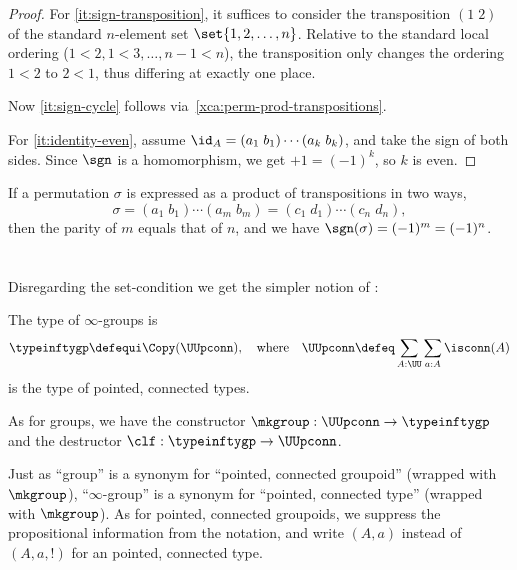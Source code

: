 \begin{proof}
  For \ref{it:sign-transposition},
  it suffices to consider the transposition $(1\;2)$ of the standard $n$-element set
  $\set{1,2,\dots,n}$.
  Relative to the standard local ordering ($1<2,1<3,\dots,n-1<n$),
  the transposition only changes the ordering $1<2$ to $2<1$,
  thus differing at exactly one place.

  Now \ref{it:sign-cycle} follows via~\cref{xca:perm-prod-transpositions}.

  For \ref{it:identity-even}, assume $\id_A = (a_1\;b_1)\cdots(a_k\;b_k)$,
  and take the sign of both sides. Since $\sgn$ is a homomorphism,
  we get $+1 = (-1)^k$, so $k$ is even.
\end{proof}

\begin{corollary}\label{cor:sign-defined}
  If a permutation $\sigma$ is expressed as a product of transpositions in two ways,
  \[
    \sigma = (a_1\;b_1)\cdots(a_m\;b_m)
    = (c_1\;d_1)\cdots(c_n\;d_n),
  \]
  then the parity of $m$ equals that of $n$,
  and we have $\sgn(\sigma)=(-1)^m=(-1)^n$.
\end{corollary}

\section{\texorpdfstring{\inftygps}{∞-groups}}
\label{sec:inftygps}

Disregarding the set-condition we get the simpler notion of \inftygps:
\begin{definition}\label{def:inftygps}
  The type of $\infty$-groups is
  \[
    \typeinftygp\defequi \Copy(\UUpconn),
    \quad\text{where}\quad
    \UUpconn\defeq \sum_{A:\UU}\sum_{a:A} \isconn(A)
  \]
  is the type of pointed, connected types.

  As for groups, we have the constructor $\mkgroup : \UUpconn \to \typeinftygp$
  and the destructor $\clf : \typeinftygp \to \UUpconn$.
\end{definition}

\begin{remark}\label{rem:pointedtypes}
  Just as ``group'' is a synonym for ``pointed, connected groupoid''
  (wrapped with $\mkgroup$),
  ``$\infty$-group'' is a synonym for ``pointed, connected type''
  (wrapped with $\mkgroup$).
  As for pointed, connected groupoids,
  we suppress the propositional information from the notation,
  and write $(A,a)$ instead of $(A,a,!)$ for an pointed, connected type.
\end{remark}


